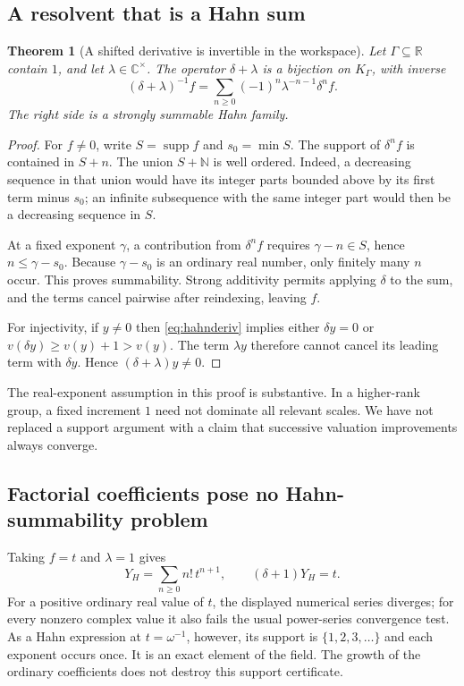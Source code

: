 \documentclass[11pt,letterpaper]{article}
\numberwithin{equation}{section}
\newtheorem{theorem}{Theorem}[section]
\theoremstyle{definition}
\theoremstyle{remark}
\newcommand{\R}{\mathbb R}
\newcommand{\C}{\mathbb C}
\newcommand{\N}{\mathbb N}
\newcommand{\supp}{\operatorname{supp}}
\begin{document}
\subsection{A resolvent that is a Hahn sum}
\begin{theorem}[A shifted derivative is invertible in the workspace]\label{thm:resolvent}
Let $\Gamma\subseteq\R$ contain $1$, and let $\lambda\in\C^\times$. The operator $\delta+\lambda$ is a bijection on $K_\Gamma$, with inverse
\begin{equation}\label{eq:resolvent}
 (\delta+\lambda)^{-1}f
 =\sum_{n\ge0}(-1)^n\lambda^{-n-1}\delta^n f.
\end{equation}
The right side is a strongly summable Hahn family.
\end{theorem}
\begin{proof}
For $f\ne0$, write $S=\supp f$ and $s_0=\min S$. The support of $\delta^n f$ is contained in $S+n$. The union $S+\N$ is well ordered. Indeed, a decreasing sequence in that union would have its integer parts bounded above by its first term minus $s_0$; an infinite subsequence with the same integer part would then be a decreasing sequence in $S$.

At a fixed exponent $\gamma$, a contribution from $\delta^n f$ requires $\gamma-n\in S$, hence $n\le\gamma-s_0$. Because $\gamma-s_0$ is an ordinary real number, only finitely many $n$ occur. This proves summability. Strong additivity permits applying $\delta$ to the sum, and the terms cancel pairwise after reindexing, leaving $f$.

For injectivity, if $y\ne0$ then \eqref{eq:hahnderiv} implies either $\delta y=0$ or $v(\delta y)\ge v(y)+1>v(y)$. The term $\lambda y$ therefore cannot cancel its leading term with $\delta y$. Hence $(\delta+\lambda)y\ne0$.
\end{proof}
The real-exponent assumption in this proof is substantive. In a higher-rank group, a fixed increment $1$ need not dominate all relevant scales. We have not replaced a support argument with a claim that successive valuation improvements always converge.

\subsection{Factorial coefficients pose no Hahn-summability problem}
Taking $f=t$ and $\lambda=1$ gives
\begin{equation}\label{eq:factorial}
 Y_H=\sum_{n\ge0}n!\,t^{n+1},\qquad
 (\delta+1)Y_H=t.
\end{equation}
For a positive ordinary real value of $t$, the displayed numerical series diverges; for every nonzero complex value it also fails the usual power-series convergence test. As a Hahn expression at $t=\omega^{-1}$, however, its support is $\{1,2,3,\ldots\}$ and each exponent occurs once. It is an exact element of the field. The growth of the ordinary coefficients does not destroy this support certificate.
\end{document}

